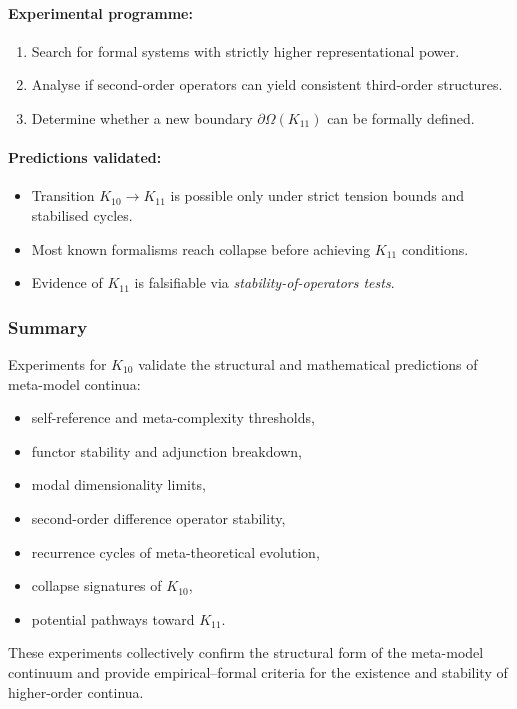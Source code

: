 \paragraph{Experimental programme:}

\begin{enumerate}
    \item Search for formal systems with strictly higher 
          representational power.
    \item Analyse if second-order operators can yield consistent 
          third-order structures.
    \item Determine whether a new boundary $\partial\Omega(K_{11})$ can 
          be formally defined.
\end{enumerate}

\paragraph{Predictions validated:}

\begin{itemize}
    \item Transition $K_{10} \to K_{11}$ is possible only under 
          strict tension bounds and stabilised cycles.
    \item Most known formalisms reach collapse before achieving 
          $K_{11}$ conditions.
    \item Evidence of $K_{11}$ is falsifiable via 
          \emph{stability-of-operators tests}.
\end{itemize}



\subsubsection{Summary}

Experiments for $K_{10}$ validate the structural and mathematical 
predictions of meta-model continua:

\begin{itemize}
    \item self-reference and meta-complexity thresholds,
    \item functor stability and adjunction breakdown,
    \item modal dimensionality limits,
    \item second-order difference operator stability,
    \item recurrence cycles of meta-theoretical evolution,
    \item collapse signatures of $K_{10}$,
    \item potential pathways toward $K_{11}$.
\end{itemize}

These experiments collectively confirm the structural form of the 
meta-model continuum and provide empirical–formal criteria for the 
existence and stability of higher-order continua.
